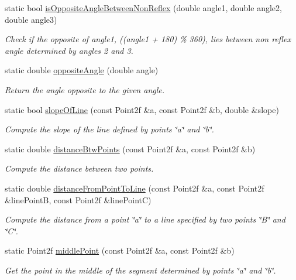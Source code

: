 \begin{DoxyCompactItemize}
static bool \hyperlink{classmultiscale_1_1Geometry2D_a28d74085708bba7fa68fbea05d0d51ad}{is\-Opposite\-Angle\-Between\-Non\-Reflex} (double angle1, double angle2, double angle3)
\begin{DoxyCompactList}\small\item\em \-Check if the opposite of angle1, ((angle1 + 180) \% 360), lies between non reflex angle determined by angles 2 and 3. \end{DoxyCompactList}\item 
static double \hyperlink{classmultiscale_1_1Geometry2D_a3bb85fa2797ba25765f0f57786cb33ef}{opposite\-Angle} (double angle)
\begin{DoxyCompactList}\small\item\em \-Return the angle opposite to the given angle. \end{DoxyCompactList}\item 
static bool \hyperlink{classmultiscale_1_1Geometry2D_a1219ac10c3647d43c5af77dc5bc574a2}{slope\-Of\-Line} (const \-Point2f \&a, const \-Point2f \&b, double \&slope)
\begin{DoxyCompactList}\small\item\em \-Compute the slope of the line defined by points \char`\"{}a\char`\"{} and \char`\"{}b\char`\"{}. \end{DoxyCompactList}\item 
static double \hyperlink{classmultiscale_1_1Geometry2D_a911b35d7abde99988bb4b43f00d6be72}{distance\-Btw\-Points} (const \-Point2f \&a, const \-Point2f \&b)
\begin{DoxyCompactList}\small\item\em \-Compute the distance between two points. \end{DoxyCompactList}\item 
static double \hyperlink{classmultiscale_1_1Geometry2D_ae6c0f66accf4ecf31b0fd96437371626}{distance\-From\-Point\-To\-Line} (const \-Point2f \&a, const \-Point2f \&line\-Point\-B, const \-Point2f \&line\-Point\-C)
\begin{DoxyCompactList}\small\item\em \-Compute the distance from a point \char`\"{}a\char`\"{} to a line specified by two points \char`\"{}\-B\char`\"{} and \char`\"{}\-C\char`\"{}. \end{DoxyCompactList}\item 
static \-Point2f \hyperlink{classmultiscale_1_1Geometry2D_a178c13bdb5cc3f26de7d5e9fd05781f5}{middle\-Point} (const \-Point2f \&a, const \-Point2f \&b)
\begin{DoxyCompactList}\small\item\em \-Get the point in the middle of the segment determined by points \char`\"{}a\char`\"{} and \char`\"{}b\char`\"{}. \end{DoxyCompactList}\item 

\end{DoxyCompactItemize}
